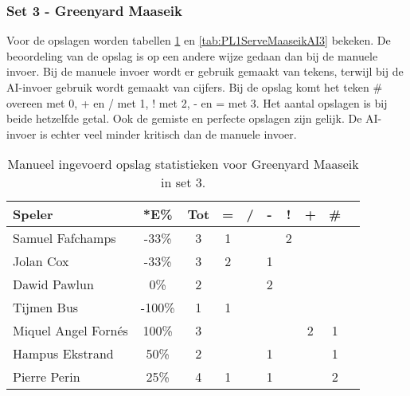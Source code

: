 \subsubsection{Set 3 - Greenyard Maaseik}
\label{sec:PL1_Greenyard3}

Voor de opslagen worden tabellen \ref{tab:PL1ServeMaaseikMan3} en \ref{tab:PL1ServeMaaseikAI3} bekeken. De beoordeling van de opslag is op een andere wijze gedaan dan bij de manuele invoer. Bij de manuele invoer wordt er gebruik gemaakt van tekens, terwijl bij de AI-invoer gebruik wordt gemaakt van cijfers. Bij de opslag komt het teken \# overeen met 0, + en / met 1, ! met 2, - en = met 3.
Het aantal opslagen is bij beide hetzelfde getal. Ook de gemiste en perfecte opslagen zijn gelijk. De AI-invoer is echter veel minder kritisch dan de manuele invoer.

\begin{table}[ht!]
    \centering
    \scriptsize
    \begin{tabular}{|l|c|c|c|c|c|c|c|c|c|}
        \hline
        \textbf{Speler}& *E\% & Tot & = & / & - & ! & + & \#\\ \hline
        Samuel Fafchamps  & -33\% & 3 & 1 &  &  & 2 &  &  \\ 
        Jolan Cox  & -33\% & 3 & 2 &  & 1 &  &  &  \\ 
        Dawid Pawlun & 0\% & 2 &  &  & 2 &  &  &  \\
        Tijmen Bus & -100\% & 1 & 1 &  &  &  &  &  \\ 
        Miquel Angel Fornés & 100\% & 3 &  &  &  &  & 2 & 1 \\ 
        Hampus Ekstrand & 50\% & 2 &  &  & 1 &  &  & 1 \\ 
        Pierre Perin & 25\% & 4 & 1 &  & 1 &  &  & 2 \\ \hline
    \end{tabular}
    \caption[Manueel ingevoerde opslagstatistieken voor Greenyard Maaseik in set 3]{\label{tab:PL1ServeMaaseikMan3}Manueel ingevoerd opslag statistieken voor Greenyard Maaseik in set 3.}
\end{table}

